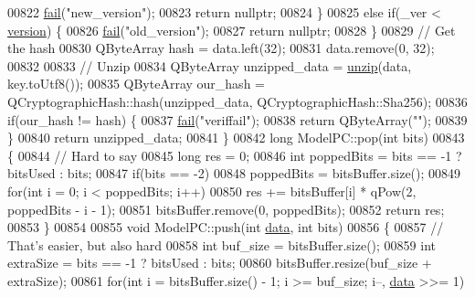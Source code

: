 \begin{DoxyCode}
{00822         \hyperlink{class_model_p_c_a47464b59b7e37fcee25e55475708aabd}{fail}(\textcolor{stringliteral}{"new\_version"});
00823         \textcolor{keywordflow}{return} \textcolor{keyword}{nullptr};
00824     \}
00825     \textcolor{keywordflow}{else} \textcolor{keywordflow}{if}(\_ver < \hyperlink{class_model_p_c_a5af48ab89e19be42a94c34ba00249401}{version}) \{
00826         \hyperlink{class_model_p_c_a47464b59b7e37fcee25e55475708aabd}{fail}(\textcolor{stringliteral}{"old\_version"});
00827         \textcolor{keywordflow}{return} \textcolor{keyword}{nullptr};
00828     \}
00829     \textcolor{comment}{// Get the hash}
00830     QByteArray hash = data.left(32);
00831     data.remove(0, 32);
00832 
00833     \textcolor{comment}{// Unzip}
00834     QByteArray unzipped\_data = \hyperlink{class_model_p_c_a6da88f166785a49f73b22c169f956fd0}{unzip}(data, key.toUtf8());
00835     QByteArray our\_hash = QCryptographicHash::hash(unzipped\_data, QCryptographicHash::Sha256);
00836     \textcolor{keywordflow}{if}(our\_hash != hash) \{
00837         \hyperlink{class_model_p_c_a47464b59b7e37fcee25e55475708aabd}{fail}(\textcolor{stringliteral}{"veriffail"});
00838         \textcolor{keywordflow}{return} QByteArray(\textcolor{stringliteral}{""});
00839     \}
00840     \textcolor{keywordflow}{return} unzipped\_data;
00841 \}
00842 \textcolor{keywordtype}{long} ModelPC::pop(\textcolor{keywordtype}{int} bits)
00843 \{
00844     \textcolor{comment}{// Hard to say}
00845     \textcolor{keywordtype}{long} res = 0;
00846     \textcolor{keywordtype}{int} poppedBits = bits == -1 ? bitsUsed : bits;
00847     \textcolor{keywordflow}{if}(bits == -2)
00848         poppedBits = bitsBuffer.size();
00849     \textcolor{keywordflow}{for}(\textcolor{keywordtype}{int} i = 0; i < poppedBits; i++)
00850         res += bitsBuffer[i] * qPow(2, poppedBits - i - 1);
00851     bitsBuffer.remove(0, poppedBits);
00852     \textcolor{keywordflow}{return} res;
00853 \}
00854 
00855 \textcolor{keywordtype}{void} ModelPC::push(\textcolor{keywordtype}{int} \hyperlink{namespace_errors_dict_setup_af570460846fb9f0c91abd308a095dcdc}{data}, \textcolor{keywordtype}{int} bits)
00856 \{
00857     \textcolor{comment}{// That's easier, but also hard}
00858     \textcolor{keywordtype}{int} buf\_size = bitsBuffer.size();
00859     \textcolor{keywordtype}{int} extraSize = bits == -1 ? bitsUsed : bits;
00860     bitsBuffer.resize(buf\_size + extraSize);
00861     \textcolor{keywordflow}{for}(\textcolor{keywordtype}{int} i = bitsBuffer.size() - 1; i >= buf\_size; i--, \hyperlink{namespace_errors_dict_setup_af570460846fb9f0c91abd308a095dcdc}{data} >>= 1)
}
\end{DoxyCode}
